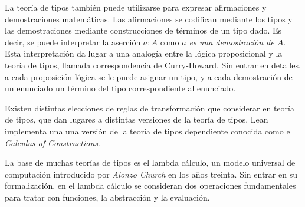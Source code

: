 La teoría de tipos también puede utilizarse para expresar afirmaciones y
demostraciones matemáticas. Las afirmaciones se codifican mediante los tipos y
las demostraciones mediante construcciones de términos de un tipo dado. Es
decir, se puede interpretar la aserción $a : A$ como \textit{$a$ es una
	demostración de $A$}. Esta interpretación da lugar a una analogía entre la
lógica proposicional y la teoría de tipos, llamada correspondencia de
Curry-Howard. Sin entrar en detalles, a cada proposición lógica se le puede
asignar un tipo, y a cada demostración de un enunciado un término del tipo
correspondiente al enunciado.


Existen distintas elecciones de reglas de transformación que considerar en
teoría de tipos, que dan lugares a distintas versiones de la teoría de tipos.
Lean implementa una una versión de la teoría de tipos dependiente conocida como
el \textit{Calculus of Constructions}.

La base de muchas teorías de tipos es el lambda cálculo, un modelo universal de
computación introducido por \textit{Alonzo Church} en los años treinta. Sin
entrar en su formalización, en el lambda cálculo se consideran dos operaciones
fundamentales para tratar con funciones, la abstracción y la evaluación.

